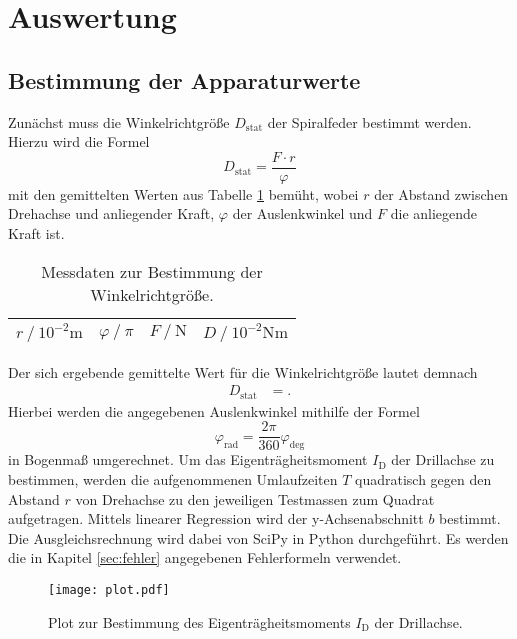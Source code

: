 \section{Auswertung}
\label{sec:Auswertung}

\subsection{Bestimmung der Apparaturwerte}

Zunächst muss die Winkelrichtgröße $D_\text{stat}$ der Spiralfeder bestimmt werden.
Hierzu wird die Formel
\begin{equation}
  D_\text{stat} = \frac{F \cdot r}{\varphi}
\end{equation}
mit den gemittelten Werten aus Tabelle \ref{tab:1} bemüht, wobei $r$ der Abstand zwischen Drehachse und anliegender Kraft, $\varphi$ der Auslenkwinkel und $F$ die anliegende Kraft ist.

\begin{table}[H]
  \centering
  \caption{Messdaten zur Bestimmung der Winkelrichtgröße.}
  \label{tab:1}
  \begin{tabular}{c c c c}
    \toprule
    {$r \ /\ 10^{-2}\si{\metre}$} & {$\varphi \ /\ \pi$} & {$F \ /\ \si{\newton}$} & {$D \ /\ 10^{-2}\si{\newton\metre}$}\\
    \midrule
    
    \bottomrule
  \end{tabular}
\end{table}

Der sich ergebende gemittelte Wert für die Winkelrichtgröße lautet demnach
\begin{align*}
  D_\text{stat}   &=   .
\end{align*}
Hierbei werden die angegebenen Auslenkwinkel mithilfe der Formel
\begin{equation}
  \varphi_\text{rad} = \frac{2 \pi}{360} \varphi_\text{deg}
\end{equation}
in Bogenmaß umgerechnet.
Um das Eigenträgheitsmoment $I_{\text{D}}$ der Drillachse zu bestimmen, werden die aufgenommenen Umlaufzeiten $T$ quadratisch gegen den Abstand $r$ von Drehachse zu den jeweiligen Testmassen zum Quadrat aufgetragen.
Mittels linearer Regression wird der y-Achsenabschnitt $b$ bestimmt.
Die Ausgleichsrechnung wird dabei von SciPy in Python durchgeführt.
Es werden die in Kapitel \ref{sec:fehler} angegebenen Fehlerformeln verwendet.

\begin{figure}
  \centering
  \texttt{[image: plot.pdf]}
  \caption{Plot zur Bestimmung des Eigenträgheitsmoments $I_{\text{D}}$ der Drillachse.}
  \label{fig:plot}
\end{figure}

